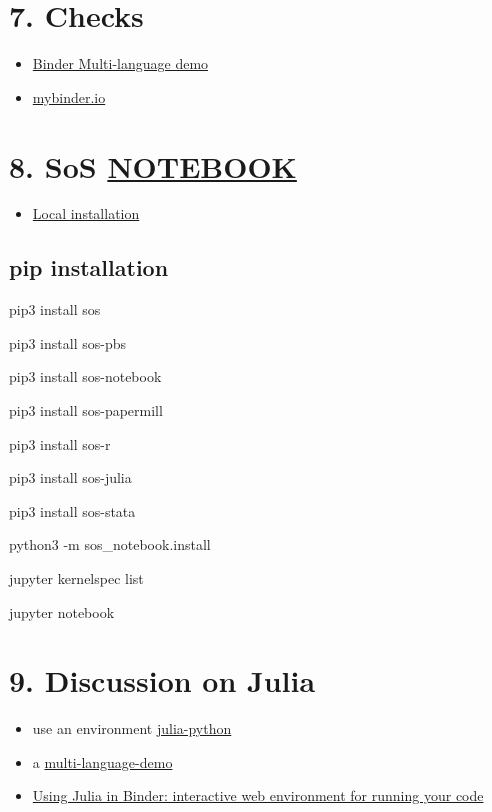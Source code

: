 \documentclass[
  12pt,
]{article}
\providecommand{\tightlist}{%
  \setlength{\itemsep}{0pt}\setlength{\parskip}{0pt}}
\begin{document}
\hypertarget{checks}{%
\section{7. Checks}\label{checks}}

\begin{itemize}
\item
  \href{https://github.com/binder-examples/multi-language-demo}{Binder
  Multi-language demo}
\item
  \href{https://mybinder.readthedocs.io/en/latest/index.html}{mybinder.io}
\end{itemize}

\hypertarget{sos-notebook}{%
\section{\texorpdfstring{8. SoS
\href{https://vatlab.github.io/sos-docs/}{NOTEBOOK}}{8. SoS NOTEBOOK}}\label{sos-notebook}}

\begin{itemize}
\tightlist
\item
  \href{https://vatlab.github.io/sos-docs/running.html\#Local-installation}{Local
  installation}
\end{itemize}

\hypertarget{pip-installation}{%
\subsection{pip installation}\label{pip-installation}}

pip3 install sos

pip3 install sos-pbs

pip3 install sos-notebook

pip3 install sos-papermill

pip3 install sos-r

pip3 install sos-julia

pip3 install sos-stata

python3 -m sos\_notebook.install

jupyter kernelspec list

jupyter notebook

\hypertarget{discussion-on-julia}{%
\section{9. Discussion on Julia}\label{discussion-on-julia}}

\begin{itemize}
\item
  use an environment
  \href{https://github.com/binder-examples/julia-python}{julia-python}
\item
  a
  \href{https://blog.jupyter.org/i-python-you-r-we-julia-baf064ca1fb6}{multi-language-demo}
\item
  \href{https://discourse.julialang.org/t/using-julia-in-binder-interactive-web-environment-for-running-your-code/21802}{Using
  Julia in Binder: interactive web environment for running your code}
\end{itemize}
\end{document}
